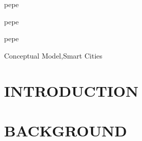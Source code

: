 \documentclass[a4paper,fleqn,spanish]{cas-dc}
\begin{document}
% 
% 
% 
% 
% 
% 



\nonumnote{}

\begin{abstract}
\lipsum[1]
\end{abstract}


\begin{highlights}
\item pepe
\item pepe
\item pepe
\end{highlights}


\begin{keywords}
Conceptual Model\sep Smart Cities
\end{keywords}

\maketitle

\section{INTRODUCTION}\label{intro}
\lipsum[12]

\section{BACKGROUND}\label{marco}
\end{document}
